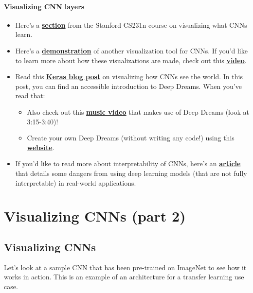 \paragraph{Visualizing CNN layers}

\begin{itemize}
    \item Here's a \href{http://cs231n.github.io/understanding-cnn/}{\textbf{section}} from the Stanford CS231n course on visualizing what CNNs learn.
    \item Here's a \href{https://www.youtube.com/watch?v=AgkfIQ4IGaM&t=78s}{\textbf{demonstration}} of another visualization tool for CNNs. If you'd like to learn more about how these visualizations are made, check out this \href{https://www.youtube.com/watch?v=ghEmQSxT6tw&t=5s}{\textbf{video}}.
    \item Read this \href{https://blog.keras.io/how-convolutional-neural-networks-see-the-world.html}{\textbf{Keras blog post}} on visualizing how CNNs see the world. In this post, you can find an accessible introduction to Deep Dreams. When you've read that:

\begin{itemize}
        \item Also check out this \href{https://www.youtube.com/watch?v=XatXy6ZhKZw}{\textbf{music video}} that makes use of Deep Dreams (look at 3:15-3:40)!
        \item Create your own Deep Dreams (without writing any code!) using this \href{https://deepdreamgenerator.com/}{\textbf{website}}.
\end{itemize}

    \item If you'd like to read more about interpretability of CNNs, here's an \href{https://openai.com/research/attacking-machine-learning-with-adversarial-examples}{\textbf{article}} that details some dangers from using deep learning models (that are not fully interpretable) in real-world applications.
\end{itemize}

\section{Visualizing CNNs (part 2)}

\subsection{Visualizing CNNs}

Let’s look at a sample CNN that has been pre-trained on ImageNet to see how it works in action. This is an example of an architecture for a transfer learning use case. \newline

